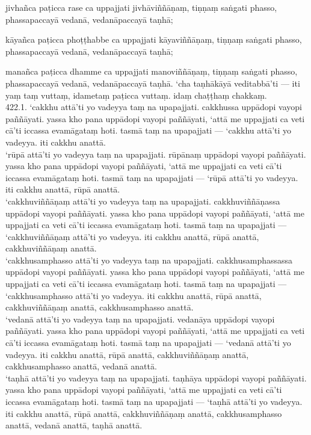 \documentclass[11pt]{article}
\begin{document}
jivhañca paṭicca rase ca uppajjati jivhāviññāṇaṃ, tiṇṇaṃ saṅgati phasso, phassapaccayā vedanā, vedanāpaccayā taṇhā;\

kāyañca paṭicca phoṭṭhabbe ca uppajjati kāyaviññāṇaṃ, tiṇṇaṃ saṅgati phasso, phassapaccayā vedanā, vedanāpaccayā taṇhā;\

manañca paṭicca dhamme ca uppajjati manoviññāṇaṃ, tiṇṇaṃ saṅgati phasso, phassapaccayā vedanā, vedanāpaccayā taṇhā. ‘cha taṇhākāyā veditabbā’ti — iti yaṃ taṃ vuttaṃ, idametaṃ paṭicca vuttaṃ. idaṃ chaṭṭhaṃ chakkaṃ.\\

422.1. ‘cakkhu attā’ti yo vadeyya taṃ na upapajjati. cakkhussa uppādopi vayopi paññāyati. yassa kho pana uppādopi vayopi paññāyati, ‘attā me uppajjati ca veti cā’ti iccassa evamāgataṃ hoti. tasmā taṃ na upapajjati — ‘cakkhu attā’ti yo vadeyya. iti cakkhu anattā.\\

‘rūpā attā’ti yo vadeyya taṃ na upapajjati. rūpānaṃ uppādopi vayopi paññāyati. yassa kho pana uppādopi vayopi paññāyati, ‘attā me uppajjati ca veti cā’ti iccassa evamāgataṃ hoti. tasmā taṃ na upapajjati — ‘rūpā attā’ti yo vadeyya. iti cakkhu anattā, rūpā anattā.\\

‘cakkhuviññāṇaṃ attā’ti yo vadeyya taṃ na upapajjati. cakkhuviññāṇassa uppādopi vayopi paññāyati. yassa kho pana uppādopi vayopi paññāyati, ‘attā me uppajjati ca veti cā’ti iccassa evamāgataṃ hoti. tasmā taṃ na upapajjati — ‘cakkhuviññāṇaṃ attā’ti yo vadeyya. iti cakkhu anattā, rūpā anattā, cakkhuviññāṇaṃ anattā.\\

‘cakkhusamphasso attā’ti yo vadeyya taṃ na upapajjati. cakkhusamphassassa uppādopi vayopi paññāyati. yassa kho pana uppādopi vayopi paññāyati, ‘attā me uppajjati ca veti cā’ti iccassa evamāgataṃ hoti. tasmā taṃ na upapajjati — ‘cakkhusamphasso attā’ti yo vadeyya. iti cakkhu anattā, rūpā anattā, cakkhuviññāṇaṃ anattā, cakkhusamphasso anattā.\\

‘vedanā attā’ti yo vadeyya taṃ na upapajjati. vedanāya uppādopi vayopi paññāyati. yassa kho pana uppādopi vayopi paññāyati, ‘attā me uppajjati ca veti cā’ti iccassa evamāgataṃ hoti. tasmā taṃ na upapajjati — ‘vedanā attā’ti yo vadeyya. iti cakkhu anattā, rūpā anattā, cakkhuviññāṇaṃ anattā, cakkhusamphasso anattā, vedanā anattā.\\

‘taṇhā attā’ti yo vadeyya taṃ na upapajjati. taṇhāya uppādopi vayopi paññāyati. yassa kho pana uppādopi vayopi paññāyati, ‘attā me uppajjati ca veti cā’ti iccassa evamāgataṃ hoti. tasmā taṃ na upapajjati — ‘taṇhā attā’ti yo vadeyya. iti cakkhu anattā, rūpā anattā, cakkhuviññāṇaṃ anattā, cakkhusamphasso anattā, vedanā anattā, taṇhā anattā.\\
\end{document}
